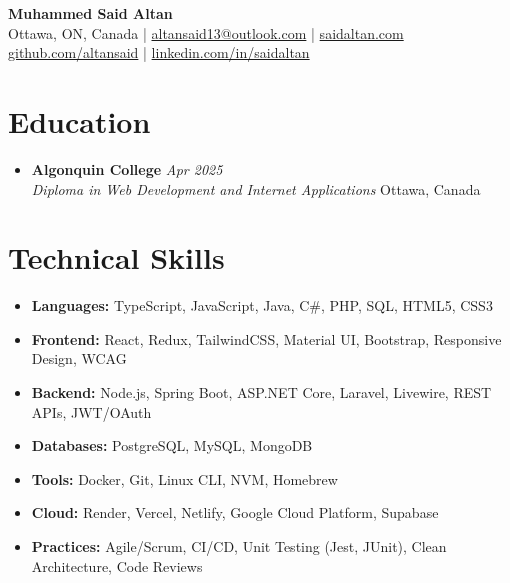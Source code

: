 \documentclass[letterpaper,10pt]{article}
\newcommand{\resumeSubheading}[4]{%
  \item
  \textbf{#1} \hfill \textit{#2}\\
  \textit{#3} \hfill {#4}
}
\newcommand{\resumeSubHeadingListStart}{\begin{itemize}[leftmargin=0in,label={}]}
\newcommand{\resumeSubHeadingListEnd}{\end{itemize}}
\begin{document}
\begin{center}
{\LARGE \textbf{Muhammed Said Altan}}\\
Ottawa, ON, Canada \hspace{1.5em}|\hspace{1.5em} \href{mailto:altansaid13@outlook.com}{altansaid13@outlook.com} \hspace{1.5em}|\hspace{1.5em} \href{https://saidaltan.com}{saidaltan.com} \\
\href{https://github.com/altansaid}{github.com/altansaid} \hspace{1.5em}|\hspace{1.5em} \href{https://linkedin.com/in/saidaltan}{linkedin.com/in/saidaltan}
\end{center}

\section{Education}
\resumeSubHeadingListStart
  \resumeSubheading
    {Algonquin College}{Apr 2025}
    {Diploma in Web Development and Internet Applications}{Ottawa, Canada}
\resumeSubHeadingListEnd

\section{Technical Skills}
\resumeSubHeadingListStart
  \item \textbf{Languages:} TypeScript, JavaScript, Java, C\#, PHP, SQL, HTML5, CSS3
  \item \textbf{Frontend:} React, Redux, TailwindCSS, Material UI, Bootstrap, Responsive Design, WCAG
  \item \textbf{Backend:} Node.js, Spring Boot, ASP.NET Core, Laravel, Livewire, REST APIs, JWT/OAuth
  \item \textbf{Databases:} PostgreSQL, MySQL, MongoDB
  \item \textbf{Tools:} Docker, Git, Linux CLI, NVM, Homebrew
  \item \textbf{Cloud:} Render, Vercel, Netlify, Google Cloud Platform, Supabase
  \item \textbf{Practices:} Agile/Scrum, CI/CD, Unit Testing (Jest, JUnit), Clean Architecture, Code Reviews
\resumeSubHeadingListEnd
\end{document}
